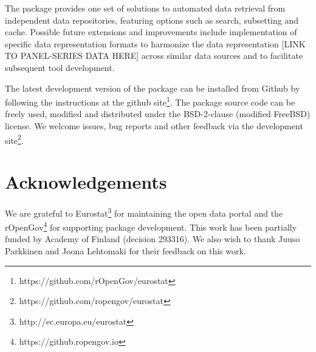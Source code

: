 The package provides one set of solutions to automated data retrieval
from independent data repositories, featuring options such as search,
subsetting and cache. Possible future extensions and improvements
include implementation of specific data representation formats to
harmonize the data representation [LINK TO PANEL-SERIES DATA HERE]
across similar data sources and to facilitate subsequent tool
development.

The latest development version of the package can be installed from
Github by following the instructions at the github
site\footnote{https://github.com/rOpenGov/eurostat}. The package
source code can be freely used, modified and distributed under the
BSD-2-clause (modified FreeBSD) license. We welcome issues, bug
reports and other feedback via the development
site\footnote{https://github.com/ropengov/eurostat}.


\section*{Acknowledgements}

We are grateful to Eurostat\footnote{http://ec.europa.eu/eurostat} for
maintaining the open data portal and the
rOpenGov\footnote{https://github.ropengov.io} for supporting 
package development. This work has been partially funded by Academy of
Finland (decision 293316). We also wish to thank Juuso Parkkinen and Joona Lehtomaki for their feedback on this work.




\address{Leo Lahti\\
  Department of Mathematics and Statistics\\
  PO Box 20014 University of Turku\\
  Finland\\}

\address{Janne Huovari\\
  Affiliation\\
  Address\\
  Country\\}

\address{Markus Kainu\\
  Affiliation\\
  Address\\
  Country\\}

\address{Przemyslaw Biecek\\
  Faculty of Mathematics, Informatics, and Mechanics\\
  University of Warsaw\\
  Banacha 2, 02-097 Warsaw\\
  Poland\\}

